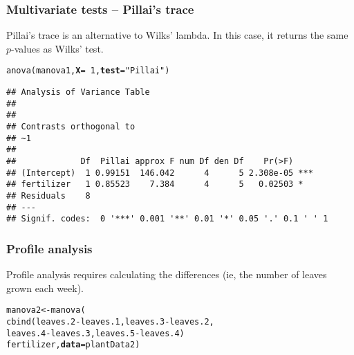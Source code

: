 \documentclass[color=usenames,dvipsnames]{beamer}\usepackage[]{graphicx}\usepackage[]{color}
\makeatletter
\newcommand{\hlnum}[1]{\textcolor[rgb]{0.69,0.494,0}{#1}}%
\newcommand{\hlstr}[1]{\textcolor[rgb]{0.749,0.012,0.012}{#1}}%
\newcommand{\hlopt}[1]{\textcolor[rgb]{0,0,0}{#1}}%
\newcommand{\hlstd}[1]{\textcolor[rgb]{0,0,0}{#1}}%
\newcommand{\hlkwb}[1]{\textcolor[rgb]{0,0.341,0.682}{#1}}%
\newcommand{\hlkwc}[1]{\textcolor[rgb]{0,0,0}{\textbf{#1}}}%
\newcommand{\hlkwd}[1]{\textcolor[rgb]{0.004,0.004,0.506}{#1}}%
\newenvironment{kframe}{%
 \def\at@end@of@kframe{}%
 \ifinner\ifhmode%
  \def\at@end@of@kframe{\end{minipage}}%
  \begin{minipage}{\columnwidth}%
 \fi\fi%
 \def\FrameCommand##1{\hskip\@totalleftmargin \hskip-\fboxsep
 \colorbox{shadecolor}{##1}\hskip-\fboxsep
     \hskip-\linewidth \hskip-\@totalleftmargin \hskip\columnwidth}%
 \MakeFramed {\advance\hsize-\width
   \@totalleftmargin\z@ \linewidth\hsize
   \@setminipage}}%
 {\par\unskip\endMakeFramed%
 \at@end@of@kframe}
\newenvironment{knitrout}{}{} %
\makeatother
\begin{document}
\begin{frame}[fragile]
  \frametitle{Multivariate tests -- Pillai's trace}
  \small
  {%
    Pillai's trace is an alternative to Wilks' lambda. In this
    case, it returns the same $p$-values as Wilks' test.}
  \vfill
  \footnotesize
\begin{knitrout}\footnotesize
{}\color{fgcolor}\begin{kframe}
\begin{alltt}
\hlkwd{anova}\hlstd{(manova1,} \hlkwc{X}\hlstd{=}\hlopt{~}\hlnum{1}\hlstd{,} \hlkwc{test}\hlstd{=}\hlstr{"Pillai"}\hlstd{)}
\end{alltt}
\begin{verbatim}
## Analysis of Variance Table
## 
## 
## Contrasts orthogonal to
## ~1
## 
##             Df  Pillai approx F num Df den Df    Pr(>F)    
## (Intercept)  1 0.99151  146.042      4      5 2.308e-05 ***
## fertilizer   1 0.85523    7.384      4      5   0.02503 *  
## Residuals    8                                             
## ---
## Signif. codes:  0 '***' 0.001 '**' 0.01 '*' 0.05 '.' 0.1 ' ' 1
\end{verbatim}
\end{kframe}
\end{knitrout}

\end{frame}












\begin{frame}[fragile]
  \frametitle{Profile analysis}
  {%
    Profile analysis requires calculating the differences (ie, the
    number of leaves grown each week).}
  \vspace{1cm}
  \footnotesize
\begin{knitrout}\footnotesize
{}\color{fgcolor}\begin{kframe}
\begin{alltt}
\hlstd{manova2} \hlkwb{<-} \hlkwd{manova}\hlstd{(}
    \hlkwd{cbind}\hlstd{(leaves.2}\hlopt{-}\hlstd{leaves.1, leaves.3}\hlopt{-}\hlstd{leaves.2,}
          \hlstd{leaves.4}\hlopt{-}\hlstd{leaves.3, leaves.5}\hlopt{-}\hlstd{leaves.4)} \hlopt{~}
    \hlstd{fertilizer,} \hlkwc{data}\hlstd{=plantData2)}
\end{alltt}
\end{kframe}
\end{knitrout}
\end{frame}
\end{document}
